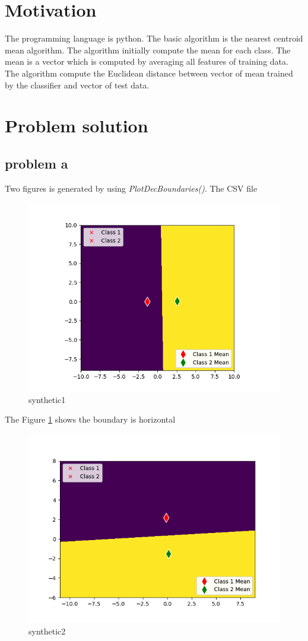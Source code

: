 \documentclass{article}
\begin{document}
	\section{Motivation}
	The programming language is python. The basic algorithm is the nearest centroid mean algorithm. The algorithm initially compute the mean for each class. The mean is a vector which is computed by averaging all features of training data. The algorithm compute the Euclidean distance between vector of mean trained by the classifier and vector of test data. 
	\section{Problem solution}
	\subsection{problem a}
	Two figures is generated by using \textit{PlotDecBoundaries()}. The CSV file 
	\begin{figure}[hbt!]
		\includegraphics[width=\linewidth]{images/synthetic1.png}
		\caption{synthetic1}
		\label{fig:synthetic1}
	\end{figure}
The Figure \ref{fig:synthetic1} shows the boundary is horizontal 
	\begin{figure}[hbt!]
		\includegraphics[width=\linewidth]{images/synthetic2.png}
		\caption{synthetic2}
		\label{fig:synthetic2}
	\end{figure}
\end{document}
